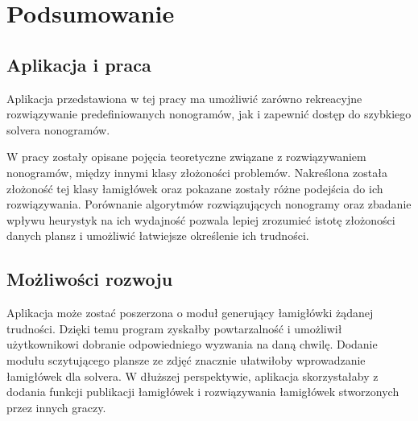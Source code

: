 \chapter{Podsumowanie}
\thispagestyle{chapterBeginStyle}



\section{Aplikacja i praca}
    Aplikacja przedstawiona w tej pracy ma umożliwić zarówno rekreacyjne rozwiązywanie predefiniowanych
nonogramów, jak i zapewnić dostęp do szybkiego solvera nonogramów. 

    W pracy zostały opisane pojęcia teoretyczne związane z rozwiązywaniem nonogramów, 
między innymi klasy złożoności problemów. Nakreślona została złożoność tej klasy łamigłówek 
oraz pokazane zostały różne podejścia do ich rozwiązywania. Porównanie algorytmów rozwiązujących
nonogramy oraz zbadanie wpływu heurystyk na ich wydajność pozwala lepiej zrozumieć istotę
złożoności danych plansz i umożliwić łatwiejsze określenie ich trudności.


\section{Możliwości rozwoju}
    Aplikacja może zostać poszerzona o moduł generujący łamigłówki żądanej trudności. Dzięki temu
program zyskałby powtarzalność i umożliwił użytkownikowi dobranie odpowiedniego wyzwania na
daną chwilę. Dodanie modułu sczytującego plansze ze zdjęć znacznie ułatwiłoby wprowadzanie łamigłówek
dla solvera. W dłuższej perspektywie, aplikacja skorzystałaby z dodania funkcji publikacji
łamigłówek i rozwiązywania łamigłówek stworzonych przez innych graczy.
